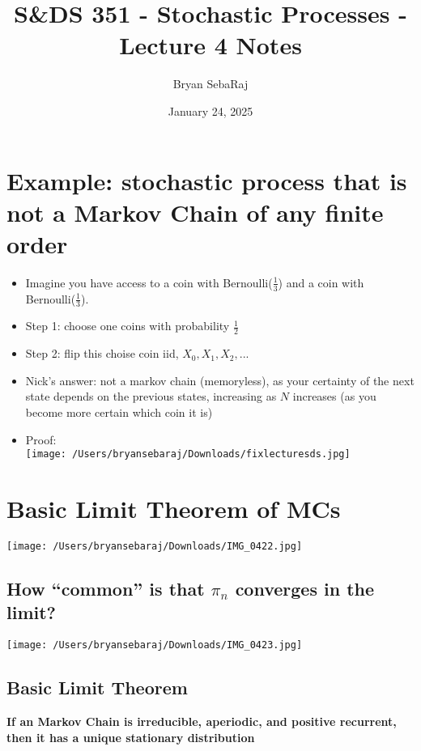 \documentclass{article}
\title{S\&DS 351 - Stochastic Processes - Lecture 4 Notes}
\author{Bryan SebaRaj}
\date{January 24, 2025}
\begin{document}
\maketitle

\section{Example: stochastic process that is not a Markov Chain of any finite order}

\begin{itemize}
    \item Imagine you have access to a coin with Bernoulli($\frac{1}{3}$) and a coin with Bernoulli($\frac{1}{3}$).
    \item Step 1: choose one coins with probability $\frac{1}{2}$
    \item Step 2: flip this choise coin iid, $X_0, X_1, X_2, ...$
    \item Nick's answer: not a markov chain (memoryless), as your certainty of the next state depends on the previous states, increasing as $N$ increases (as you become more certain which coin it is)
    \item Proof: \\ 

        \texttt{[image: /Users/bryansebaraj/Downloads/fixlecturesds.jpg]}
\end{itemize}

\section{Basic Limit Theorem of MCs}

\texttt{[image: /Users/bryansebaraj/Downloads/IMG\_0422.jpg]}

\subsection{How ``common'' is that $\pi_n$ converges in the limit?}

\texttt{[image: /Users/bryansebaraj/Downloads/IMG\_0423.jpg]}

\subsection{Basic Limit Theorem}

\textbf{If an Markov Chain is irreducible, aperiodic, and positive recurrent, then it has a unique stationary distribution}
\end{document}
